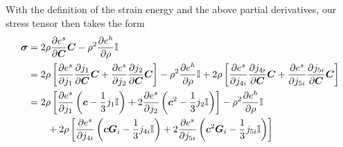 \documentclass{article}
\begin{document}
With the definition of the strain energy and the above partial derivatives, our stress tensor then takes the form
\begin{align*}
\bsigma &= 2\rho \frac{\partial e^s}{\partial \bC} \bC -\rho^2 \frac{\partial e^h}{\partial \rho} \polI \\
%
  &= 2\rho \left[ \frac{\partial e^s}{\partial j_1} \frac{\partial j_1}{\partial \bC} \bC + \frac{\partial e^s}{\partial j_2} \frac{\partial j_2}{\partial \bC} \bC \right] -\rho^2 \frac{\partial e^h}{\partial \rho} \polI + 2\rho \left[ \frac{\partial e^s}{\partial j_{4i}} \frac{\partial j_{4i}}{\partial \bC} \bC + \frac{\partial e^s}{\partial j_{5i}} \frac{\partial j_{5i}}{\partial \bC} \bC \right] \\
%
  &= 2\rho\left[\frac{\partial e^s}{\partial j_1}\left(\bc-\frac{1}{3}j_1 \polI\right)+2\frac{\partial e^s}{\partial j_2}\left(\bc^2-\frac{1}{3}j_2\polI \right) \right]-\rho^2\frac{\partial e^h}{\partial \rho}\polI \notag \\
  &\qquad + 2\rho\left[ \frac{\partial e^s}{\partial j_{4i}} \left(\bc \bG_i - \frac{1}{3} j_{4i} \polI\right) + 2\frac{\partial e^s}{\partial j_{5i}} \left(\bc^2\bG_i -\frac{1}{3} j_{5i} \polI\right) \right]
\end{align*}

\newpage

\let\oldbibitem\bibitem
\renewcommand{\bibitem}{\setlength{\itemsep}{0pt}\oldbibitem}
% 

\end{document}
